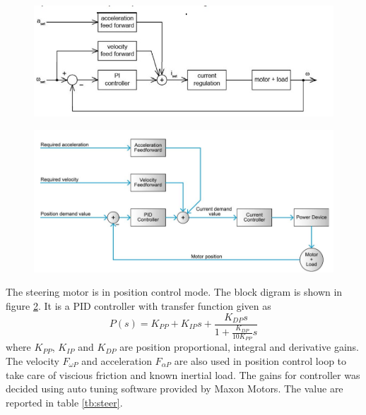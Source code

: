 \begin{figure}
	\includegraphics[width=\linewidth,keepaspectratio]{Chapter5/fig/velLoop}
	\label{fig:velloop} 
\end{figure}
\begin{figure}
	\includegraphics[width=\linewidth,keepaspectratio]{Chapter5/fig/posLoop}
	\label{fig:posloop} 
\end{figure}


The steering motor is in position control mode. The block digram is shown in figure \ref{fig:posloop}. It is a PID controller with transfer function given as 
\begin{equation}
P(s)=K_{PP}+K_{IP}s+\frac{K_{DP}s}{1+\frac{K_{DP}}{10 K_{PP}}s}
\end{equation}
where $K_{PP}$, $K_{IP}$ and $K_{DP}$ are position proportional, integral and derivative gains. The velocity $F_{\omega P}$ and acceleration $F_{\alpha P}$ are also used in position control loop to take care of viscious friction and known inertial load. The gains for controller was decided using auto tuning software provided by Maxon Motors. The value are reported in table \ref{tb:steer}.


